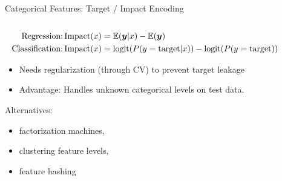 \begin{frame}{Categorical Features: Target / Impact Encoding}
\begin{columns}
\begin{column}{0.7\textwidth}
      \vspace*{-0.5cm}  
      {\footnotesize
      \begin{align*}
      \text{Regression:} \operatorname{Impact}(x) &= \operatorname*{\mathbb{E}}(\bm{y} | x) - \operatorname*{\mathbb{E}}(\bm{y}) \\
      \text{Classification:} \operatorname{Impact}(x) &= \operatorname{logit}(P( y = \text{target} | x)) - \operatorname{logit}(P( y = \text{target}))
      \end{align*}
      }
      \vspace*{-0.5cm}  
      \begin{itemize}
        \item Needs regularization (through CV) to prevent target leakage 
        \item Advantage: Handles unknown categorical levels on test data.
      \end{itemize}
      Alternatives: 
      \begin{itemize}
    \item factorization machines, 
    \item clustering feature levels, 
    \item feature hashing
      \end{itemize}
    \end{column}%
    \begin{column}{0.3\textwidth}
      \vspace{-1cm}
      \begin{center}
\end{center}
\end{column}
\end{columns}
\end{frame}
